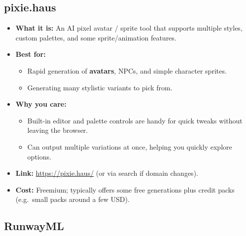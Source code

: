 \documentclass[11pt]{article}
\begin{document}
\subsection{pixie.haus}

\begin{itemize}
    \item \textbf{What it is:} An AI pixel avatar / sprite tool that supports multiple styles, custom palettes, and some sprite/animation features.
    \item \textbf{Best for:}
    \begin{itemize}
        \item Rapid generation of \textbf{avatars}, NPCs, and simple character sprites.
        \item Generating many stylistic variants to pick from.
    \end{itemize}
    \item \textbf{Why you care:}
    \begin{itemize}
        \item Built-in editor and palette controls are handy for quick tweaks without leaving the browser.
        \item Can output multiple variations at once, helping you quickly explore options.
    \end{itemize}
    \item \textbf{Link:} \url{https://pixie.haus/} (or via search if domain changes).
    \item \textbf{Cost:} Freemium; typically offers some free generations plus credit packs (e.g.\ small packs around a few USD).
\end{itemize}

\subsection{RunwayML}
\end{document}
